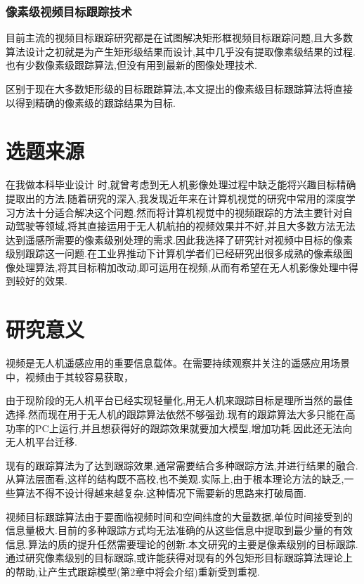 \subsubsection{像素级视频目标跟踪技术}
目前主流的视频目标跟踪研究都是在试图解决矩形框视频目标跟踪问题,且大多数算法设计之初就是为产生矩形级结果而设计,其中几乎没有提取像素级结果的过程.也有少数像素级跟踪算法,但没有用到最新的图像处理技术.
\par
区别于现在大多数矩形级的目标跟踪算法,本文提出的像素级目标跟踪算法将直接以得到精确的像素级的跟踪结果为目标.

\section{选题来源}
在我做本科毕业设计
\supercite{benchme}
时,就曾考虑到无人机影像处理过程中缺乏能将兴趣目标精确提取出的方法.随着研究的深入,我发现近年来在计算机视觉的研究中常用的深度学习方法十分适合解决这个问题.然而将计算机视觉中的视频跟踪的方法主要针对自动驾驶等领域,将其直接运用于无人机航拍的视频效果并不好,并且大多数方法无法达到遥感所需要的像素级别处理的需求.因此我选择了研究针对视频中目标的像素级别跟踪这一问题.在工业界推动下计算机学者们已经研究出很多成熟的像素级图像处理算法,将其目标稍加改动,即可运用在视频,从而有希望在无人机影像处理中得到较好的效果.

\section{研究意义}
视频是无人机遥感应用的重要信息载体。在需要持续观察并关注的遥感应用场景中，视频由于其较容易获取，
\par
由于现阶段的无人机平台已经实现轻量化,用无人机来跟踪目标是理所当然的最佳选择.然而现在用于无人机的跟踪算法依然不够强劲.现有的跟踪算法大多只能在高功率的PC上运行,并且想获得好的跟踪效果就要加大模型,增加功耗.因此还无法向无人机平台迁移.
\par
现有的跟踪算法为了达到跟踪效果,通常需要结合多种跟踪方法,并进行结果的融合.从算法层面看,这样的结构既不高校,也不美观.实际上,由于根本理论方法的缺乏,一些算法不得不设计得越来越复杂.这种情况下需要新的思路来打破局面.
\par
视频目标跟踪算法由于要面临视频时间和空间纬度的大量数据,单位时间接受到的信息量极大.目前的多种跟踪方式均无法准确的从这些信息中提取到最少量的有效信息.算法的质的提升任然需要理论的创新.本文研究的主要是像素级别的目标跟踪.通过研究像素级别的目标跟踪,或许能获得对现有的外包矩形目标跟踪算法理论上的帮助,让产生式跟踪模型(第2章中将会介绍)重新受到重视.


